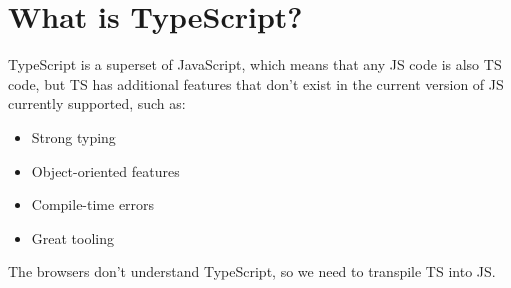 \chapter{What is TypeScript?}
TypeScript is a superset of JavaScript, which means that any JS code is also TS code, but TS has additional features that don't exist in the current version of JS currently supported, such as:

\begin{itemize}
    \item Strong typing
    \item Object-oriented features
    \item Compile-time errors
    \item Great tooling
\end{itemize}

The browsers don't understand TypeScript, so we need to transpile TS into JS.